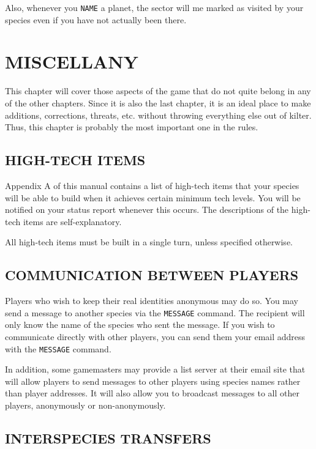 \documentclass[10pt,titlepage]{article}
\begin{document}
Also, whenever you \texttt{NAME} a planet, the sector will me marked as visited by your
species even if you have not actually been there.



\section{MISCELLANY}
\label{sec:miscellany}


This chapter will cover those aspects of the game that do not quite belong
in any of the other chapters.  Since it is also the last chapter, it is an
ideal place to make additions, corrections, threats, etc. without throwing
everything else out of kilter.  Thus, this chapter is probably the most
important one in the rules.


\subsection{HIGH-TECH ITEMS}
\label{sec:hightechitems}


Appendix A of this manual contains a list of high-tech items that your species
will be able to build when it achieves certain minimum tech levels.  You will
be notified on your status report whenever this occurs.  The descriptions of
the high-tech items are self-explanatory.

All high-tech items must be built in a single turn, unless specified otherwise.


\subsection{COMMUNICATION BETWEEN PLAYERS}
\label{sec:communicationbetweenplayers}


Players who wish to keep their real identities anonymous may do so.  You may
send a message to another species via the \texttt{MESSAGE} command.  The recipient
will only know the name of the species who sent the message.  If you wish to
communicate directly with other players, you can send them your email address
with the \texttt{MESSAGE} command.

In addition, some gamemasters may provide a list server at their email site
that will allow players to send messages to other players using species names
rather than player addresses.  It will also allow you to broadcast messages to
all other players, anonymously or non-anonymously.


\subsection{INTERSPECIES TRANSFERS}
\label{sec:interspeciestransfers}
\end{document}
